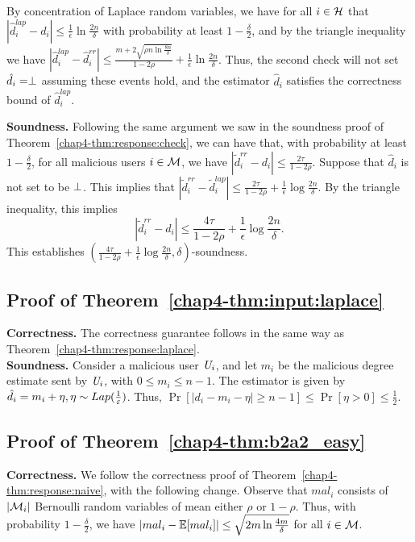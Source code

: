 By concentration of Laplace random variables, we have for all $i \in \mathcal{H}$ that $|\hat{d}_i^{lap} - d_i| \leq \frac{1}{\epsilon} \ln \frac{2n}{\delta}$ with probability at least $1-\frac{\delta}{2}$, 
and by the triangle inequality we have $|\hat{d}_i^{lap} - \hat{d}_i^{rr}| \leq \frac{m + 2 \sqrt{\rho n \ln \frac{8n}{\delta}}}{1-2\rho} + \frac{1}{\epsilon}\ln \frac{2n}{\delta}$. Thus, the second check will not set $\hat{d}_i = \perp$ assuming these events hold, and the estimator $\hat{d}_i$ satisfies the correctness bound of $\hat{d}_i^{lap}$.

\textbf{Soundness.}
Following the same argument we saw in the soundness proof of Theorem~\ref{chap4-thm:response:check}, we can have that, with probability at least $1-\frac{\delta}{2}$, for all malicious users $i \in \mathcal{M}$, we have $|\tilde{d}_i^{rr} - d_i| \leq \frac{2\tau}{1-2\rho}$. Suppose that $\hat{d}_i$ is not set to be $\perp$. This implies that $|\tilde{d}_i^{rr} - \tilde{d}_i^{lap}| \leq \frac{2\tau}{1-2\rho} + \frac{1}{\epsilon}\log \frac{2n}{\delta}$.  By the triangle inequality, this implies
\[
    |\tilde{d}_i^{rr} - d_i| \leq \frac{4\tau}{1-2\rho} + \frac{1}{\epsilon} \log \frac{2n}{\delta}.
\]
This establishes $(\frac{4\tau}{1-2\rho} + \frac{1}{\epsilon} \log \frac{2n}{\delta}, \delta)$-soundness.

\subsection{Proof of Theorem~\ref{chap4-thm:input:laplace}}\label{chap4-app:thm:input:laplace}
\textbf{Correctness.} The correctness guarantee follows in the same way as Theorem~\ref{chap4-thm:response:laplace}.
\\
\noindent \textbf{Soundness.} Consider a malicious user $\textit{U}_i$, and let $m_i$ be the malicious degree estimate sent by $\textit{U}_i$, with $0 \leq m_i \leq n-1$. The estimator is given by $\hat{d}_i = m_i+\eta, \eta \sim Lap(\frac{1}{\varepsilon})$. 
Thus, $\Pr[|d_i - m_i - \eta| \geq n-1] \leq \Pr[\eta > 0] \leq \frac{1}{2}$.


\subsection{Proof of Theorem~\ref{chap4-thm:b2a2_easy}} \label{chap4-app:thm:b2a2_easy}
\noindent \textbf{Correctness.}
We follow the correctness proof of Theorem~\ref{chap4-thm:response:naive}, with the following change. Observe that $mal_i$ consists of $|\mathcal{M}_i|$ Bernoulli random variables of mean either $\rho$ or $1-\rho$. Thus, with probability $1-\frac{\delta}{2}$, we have $|mal_i - \operatorname{\mathbb{E}}[mal_i]| \leq \sqrt{2m\ln \frac{4m}{\delta}}$ for all $i \in \mathcal{M}$. 

